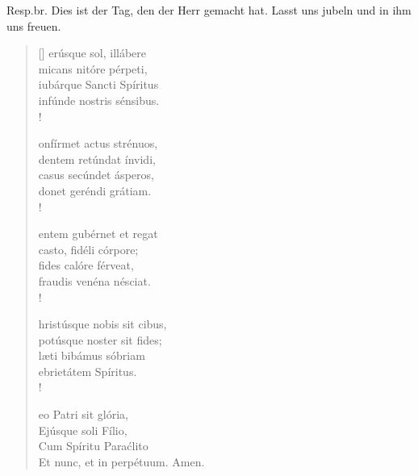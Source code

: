 \vspace{0.6cm}


\resp


Resp.br. Dies ist der Tag, den der Herr gemacht hat. Lasst uns jubeln und in ihm uns freuen.

\medskip


\def\greinitialformat#1{{\fontsize{40}{40}\selectfont #1}}
\gresetfirstlineaboveinitial{\small \textcolor{red}{hieme}}{}
\setaboveinitialseparation{0.72mm}


\begin{verse}[\versewidth]
erúsque sol, illábere\\
micans nitóre pérpeti, \\
iubárque Sancti Spíritus\\
infúnde nostris sénsibus.\\!

onfírmet actus strénuos, \\
dentem retúndat ínvidi,\\
casus secúndet ásperos, \\
donet geréndi grátiam.\\!

entem gubérnet et regat\\
casto, fidéli córpore;\\
fides calóre férveat, \\
fraudis venéna nésciat.\\!

hristúsque nobis sit cibus, \\
potúsque noster sit fides;\\
læti bibámus sóbriam\\
ebrietátem Spíritus.\\!

eo Patri sit glória,\\
Ejúsque soli Fílio,\\
Cum Spíritu Paraćlito\\
Et nunc, et in perpétuum. Amen.\\

\end{verse}

